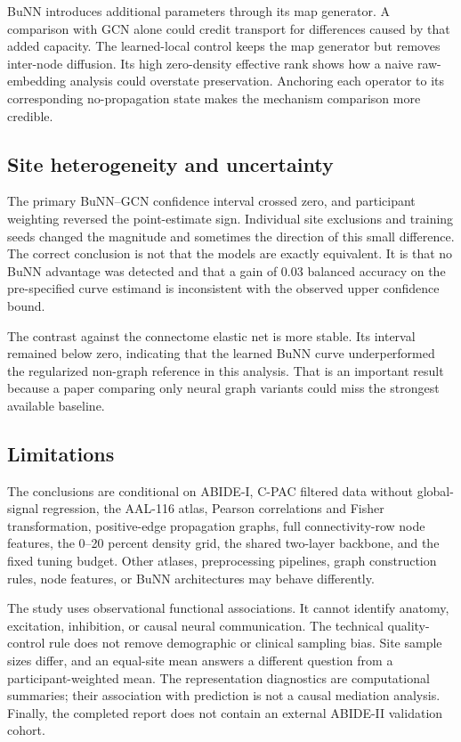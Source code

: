 \documentclass[11pt,a4paper]{article}
\begin{document}
BuNN introduces additional parameters through its map generator. A comparison
with GCN alone could credit transport for differences caused by that added
capacity. The learned-local control keeps the map generator but removes
inter-node diffusion. Its high zero-density effective rank shows how a naive
raw-embedding analysis could overstate preservation. Anchoring each operator
to its corresponding no-propagation state makes the mechanism comparison more
credible.

\subsection{Site heterogeneity and uncertainty}

The primary BuNN--GCN confidence interval crossed zero, and participant
weighting reversed the point-estimate sign. Individual site exclusions and
training seeds changed the magnitude and sometimes the direction of this
small difference. The correct conclusion is not that the models are exactly
equivalent. It is that no BuNN advantage was detected and that a gain of 0.03
balanced accuracy on the pre-specified curve estimand is inconsistent with
the observed upper confidence bound.

The contrast against the connectome elastic net is more stable. Its interval
remained below zero, indicating that the learned BuNN curve underperformed the
regularized non-graph reference in this analysis. That is an important result
because a paper comparing only neural graph variants could miss the strongest
available baseline.

\subsection{Limitations}

The conclusions are conditional on ABIDE-I, C-PAC filtered data without
global-signal regression, the AAL-116 atlas, Pearson correlations and Fisher
transformation, positive-edge propagation graphs, full connectivity-row node
features, the 0--20 percent density grid, the shared two-layer backbone, and
the fixed tuning budget. Other atlases, preprocessing pipelines, graph
construction rules, node features, or BuNN architectures may behave
differently.

The study uses observational functional associations. It cannot identify
anatomy, excitation, inhibition, or causal neural communication. The technical
quality-control rule does not remove demographic or clinical sampling bias.
Site sample sizes differ, and an equal-site mean answers a different question
from a participant-weighted mean. The representation diagnostics are
computational summaries; their association with prediction is not a causal
mediation analysis. Finally, the completed report does not contain an external
ABIDE-II validation cohort.
\end{document}
